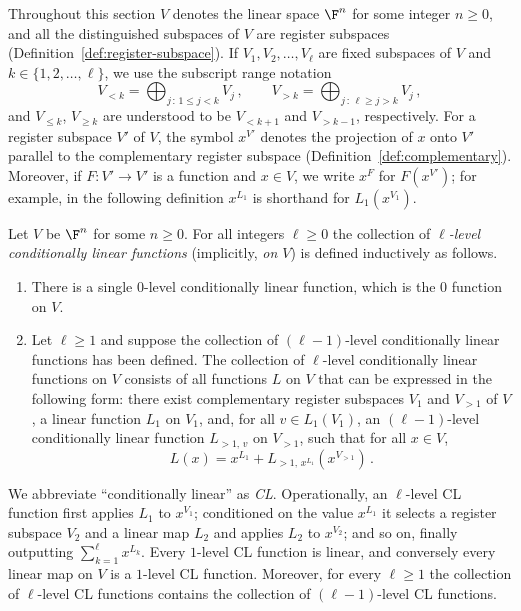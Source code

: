 Throughout this section $V$ denotes the linear space $\F^n$ for some integer $n \ge 0$, and all the distinguished subspaces of $V$ are register subspaces (Definition~\ref{def:register-subspace}). If $V_1, V_2, \dots, V_\ell$ are fixed subspaces of $V$ and $k \in \{1, 2, \dots, \ell\}$, we use the subscript range notation
\[
	V_{<k} = \bigoplus_{j\,:\,1 \le j < k} V_j\,, \qquad V_{>k} = \bigoplus_{j\,:\,\ell \ge j > k} V_j\,,
\]
and $V_{\le k}$, $V_{\ge k}$ are understood to be $V_{<k+1}$ and $V_{>k-1}$, respectively. For a register subspace $V'$ of $V$, the symbol $x^{V'}$ denotes the projection of $x$ onto $V'$ parallel to the complementary register subspace (Definition~\ref{def:complementary}). Moreover, if $F \colon V' \to V'$ is a function and $x \in V$, we write $x^F$ for $F(x^{V'})$; for example, in the following definition $x^{L_1}$ is shorthand for $L_1(x^{V_1})$.

\begin{definition}\label{def:cl-func}
	Let $V$ be $\F^n$ for some $n \ge 0$. For all integers $\ell \ge 0$ the collection of \emph{$\ell$-level conditionally linear functions} (implicitly, \emph{on $V$}) is defined inductively as follows.
	\begin{enumerate}
		\item There is a single $0$-level conditionally linear function, which is the $0$ function on $V$.
		\item Let $\ell \ge 1$ and suppose the collection of $(\ell-1)$-level conditionally linear functions has been defined. The collection of $\ell$-level conditionally linear functions on $V$ consists of all functions $L$ on $V$ that can be expressed in the following form: there exist complementary register subspaces $V_1$ and $V_{>1}$ of $V$, a linear function $L_1$ on $V_1$, and, for all $v \in L_1(V_1)$, an $(\ell-1)$-level conditionally linear function $L_{>1,\,v}$ on $V_{>1}$, such that for all $x \in V$,
		\[
			L(x) = x^{L_1} + L_{>1,\,x^{L_1}}(x^{V_{>1}})\,.
		\]
	\end{enumerate}
\end{definition}

We abbreviate ``conditionally linear'' as \emph{CL}. Operationally, an $\ell$-level CL function first applies $L_1$ to $x^{V_1}$; conditioned on the value $x^{L_1}$ it selects a register subspace $V_2$ and a linear map $L_2$ and applies $L_2$ to $x^{V_2}$; and so on, finally outputting $\sum_{k=1}^{\ell} x^{L_k}$. Every $1$-level CL function is linear, and conversely every linear map on $V$ is a $1$-level CL function. Moreover, for every $\ell \ge 1$ the collection of $\ell$-level CL functions contains the collection of $(\ell-1)$-level CL functions.

